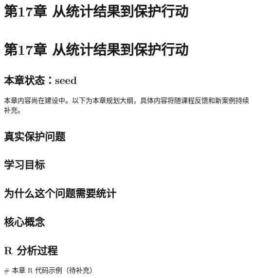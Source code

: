 \documentclass[
  letterpaper,
]{scrbook}
\newenvironment{Shaded}{\begin{snugshade}}{\end{snugshade}}
\newcommand{\CommentTok}[1]{\textcolor[rgb]{0.37,0.37,0.37}{#1}}
\begin{document}
\chapter{第17章
从统计结果到保护行动}\label{ux7b2c17ux7ae0-ux4eceux7edfux8ba1ux7ed3ux679cux5230ux4fddux62a4ux884cux52a8}

\chapter{第17章
从统计结果到保护行动}\label{ux7b2c17ux7ae0-ux4eceux7edfux8ba1ux7ed3ux679cux5230ux4fddux62a4ux884cux52a8-1}

\section{本章状态：seed}\label{ux672cux7ae0ux72b6ux6001seed-6}

本章内容尚在建设中。以下为本章规划大纲，具体内容将随课程反馈和新案例持续补充。

\section{真实保护问题}\label{ux771fux5b9eux4fddux62a4ux95eeux9898-13}

\section{学习目标}\label{ux5b66ux4e60ux76eeux6807-9}

\section{为什么这个问题需要统计}\label{ux4e3aux4ec0ux4e48ux8fd9ux4e2aux95eeux9898ux9700ux8981ux7edfux8ba1-6}

\section{核心概念}\label{ux6838ux5fc3ux6982ux5ff5-6}

\section{R 分析过程}\label{r-ux5206ux6790ux8fc7ux7a0b-8}

\begin{Shaded}
\begin{Highlighting}[]
\CommentTok{\# 本章 R 代码示例（待补充）}
\end{Highlighting}
\end{Shaded}
\end{document}
